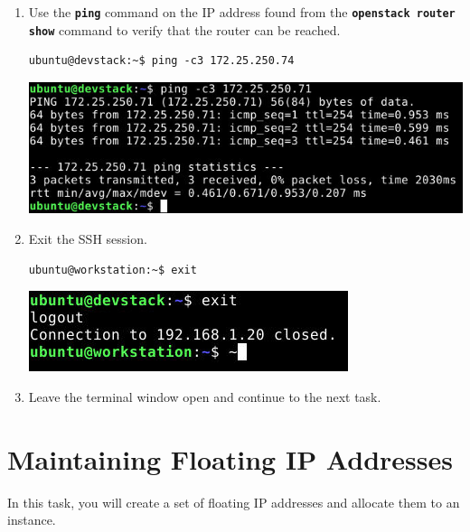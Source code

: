 \documentclass[letterpaper, 12pt]{article}
\begin{document}
\begin{enumerate}
    \item Use the \textbf{\texttt{ping}} command on the IP address found from the
    \textbf{\texttt{openstack router show}} command to verify that the router can be reached.
\begin{lstlisting}
ubuntu@devstack:~$ ping -c3 172.25.250.74
\end{lstlisting}

    \begin{center}
        \includegraphics[width=\linewidth]{images/part2/step18.png}
    \end{center}

    \item Exit the SSH session.
\begin{lstlisting}
ubuntu@workstation:~$ exit
\end{lstlisting}

    \begin{center}
        \includegraphics[width=\linewidth]{images/part2/step19.png}
    \end{center}

    \item Leave the terminal window open and continue to the next task.

\end{enumerate}

\section{Maintaining Floating IP Addresses}
\label{sec:maintaining_floating_ip_addresses}
In this task, you will create a set of floating IP addresses and allocate them to an instance.
\end{document}

